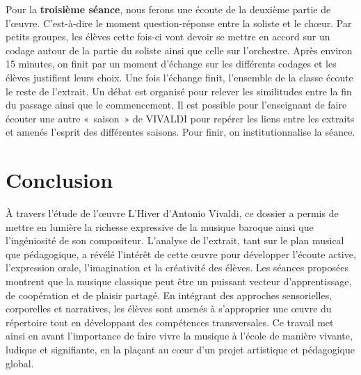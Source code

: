 \documentclass[12pt]{article}
\begin{document}
Pour la \textbf{troisième séance}, nous ferons une écoute de la deuxième partie de l’œuvre. C'est-à-dire le moment question-réponse entre la soliste et le chœur. 
Par petits groupes, les élèves cette fois-ci vont devoir se mettre en accord sur un codage autour de la partie du soliste ainsi que celle sur l’orchestre. Après environ 15 minutes, on finit par un moment d’échange sur les différents codages et les élèves justifient leurs choix. Une fois l’échange finit, l’ensemble de la classe écoute le reste de l’extrait. Un débat est organisé pour relever les similitudes entre la fin du passage ainsi que le commencement. Il est possible pour l’enseignant de faire écouter une autre « saison » de VIVALDI pour repérer les liens entre les extraits et amenés l’esprit des différentes saisons. Pour finir, on institutionnalise la séance.


\section{Conclusion}

À travers l’étude de l’œuvre L’Hiver d’Antonio Vivaldi, ce dossier a permis de mettre en lumière la richesse expressive de la musique baroque ainsi que l’ingéniosité de son compositeur. L’analyse de l’extrait, tant sur le plan musical que pédagogique, a révélé l’intérêt de cette œuvre pour développer l’écoute active, l’expression orale, l’imagination et la créativité des élèves.
Les séances proposées montrent que la musique classique peut être un puissant vecteur d’apprentissage, de coopération et de plaisir partagé. En intégrant des approches sensorielles, corporelles et narratives, les élèves sont amenés à s’approprier une œuvre du répertoire tout en développant des compétences transversales.
Ce travail met ainsi en avant l’importance de faire vivre la musique à l’école de manière vivante, ludique et signifiante, en la plaçant au cœur d’un projet artistique et pédagogique global.
\end{document}
